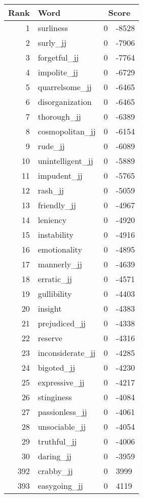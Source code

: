 \begin{longtable}[!htbp]{| rlr@{.}l |}
    \hline
    \textbf{Rank} & \textbf{Word} & \multicolumn{2}{c|}{\textbf{Score}} \\
    \hline
    \endhead
    1 & surliness & 0 & -8528 \\
    2 & surly\_jj & 0 & -7906 \\
    3 & forgetful\_jj & 0 & -7764 \\
    4 & impolite\_jj & 0 & -6729 \\
    5 & quarrelsome\_jj & 0 & -6465 \\
    6 & disorganization & 0 & -6465 \\
    7 & thorough\_jj & 0 & -6389 \\
    8 & cosmopolitan\_jj & 0 & -6154 \\
    9 & rude\_jj & 0 & -6089 \\
    10 & unintelligent\_jj & 0 & -5889 \\
    11 & impudent\_jj & 0 & -5765 \\
    12 & rash\_jj & 0 & -5059 \\
    13 & friendly\_jj & 0 & -4967 \\
    14 & leniency & 0 & -4920 \\
    15 & instability & 0 & -4916 \\
    16 & emotionality & 0 & -4895 \\
    17 & mannerly\_jj & 0 & -4639 \\
    18 & erratic\_jj & 0 & -4571 \\
    19 & gullibility & 0 & -4403 \\
    20 & insight & 0 & -4383 \\
    21 & prejudiced\_jj & 0 & -4338 \\
    22 & reserve & 0 & -4316 \\
    23 & inconsiderate\_jj & 0 & -4285 \\
    24 & bigoted\_jj & 0 & -4230 \\
    25 & expressive\_jj & 0 & -4217 \\
    26 & stinginess & 0 & -4084 \\
    27 & passionless\_jj & 0 & -4061 \\
    28 & unsociable\_jj & 0 & -4054 \\
    29 & truthful\_jj & 0 & -4006 \\
    30 & daring\_jj & 0 & -3959 \\
    392 & crabby\_jj & 0 & 3999 \\
    393 & easygoing\_jj & 0 & 4119 \\

\end{longtable}
